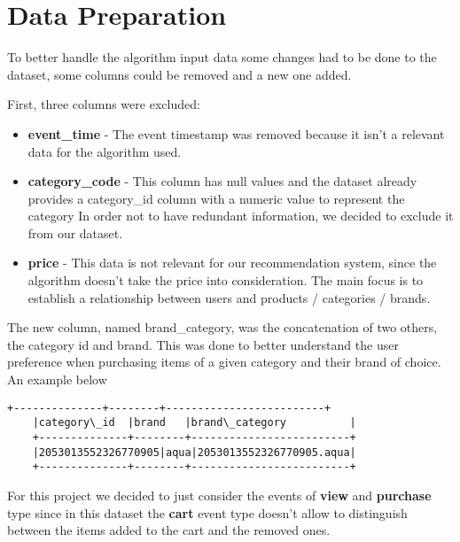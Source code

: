 \section{Data Preparation}
\label{data_prep}

To better handle the algorithm input data some changes had to be done to the dataset,
some columns could be removed and a new one added.

First, three columns were excluded:
\begin{itemize}
    \item \textbf{event\_time} - The event timestamp was removed because it isn't a relevant data for the algorithm used.
    \item \textbf{category\_code} - This column has null values and the dataset already provides a category\_id column with a numeric value to represent the category
    In order not to have redundant information, we decided to exclude it from our dataset.
    \item \textbf{price} - This data is not relevant for our recommendation system, since the algorithm doesn't take the price into consideration.
    The main focus is to establish a relationship between users and products / categories / brands.
\end{itemize}

The new column, named brand\_category, was the concatenation of two others, the category id and brand. This was done to better 
understand the user preference when purchasing items of a given category and their brand of choice.
An example below

\begin{Verbatim}[commandchars=\\\{\}]
    +--------------+--------+-------------------------+
    |category\_id  |brand   |brand\_category          |
    +--------------+--------+-------------------------+
    |2053013552326770905|aqua|2053013552326770905.aqua|
    +--------------+--------+-------------------------+
\end{Verbatim}

For this project we decided to just consider the events of \textbf{view} and \textbf{purchase} type since in this dataset the \textbf{cart} event type
doesn't allow to distinguish between the items added to the cart and the removed ones.


